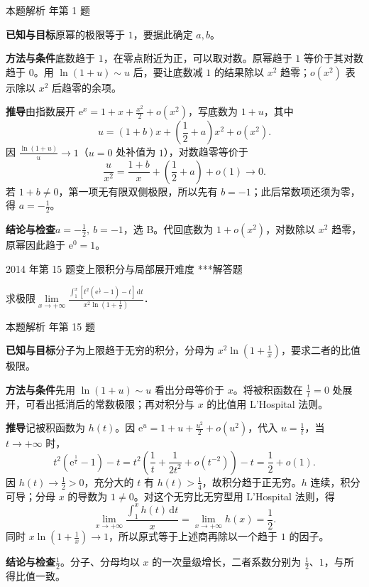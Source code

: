 \documentclass[UTF8,zihao=-4,fontset=fandol]{ctexart}
\renewcommand{\lim}{\operatorname*{lim}\limits}
\newcounter{BankQuestion}
\newcommand{\QuestionPage}[7]{%
  \stepcounter{BankQuestion}%
  \par\noindent\begin{minipage}{\linewidth}
  \raggedright
  {\small\textcolor{black!60}{#3\quad #5\quad 难度 #7}\hfill\textcolor{accent}{#2}}\par\smallskip}
\newcommand{\QuestionEnd}{\end{minipage}\par\medskip}
\newcommand{\QuestionPage}[7]{%
  \clearpage
  \stepcounter{BankQuestion}%
  {\small\textcolor{accent}{#1\hfill #2}}\par\medskip
  {\small\textcolor{black!60}{#3\quad #5\quad 难度 #7\hfill \arabic{BankQuestion} / 234}}\par\vspace{9bp}}
\newcommand{\QuestionEnd}{}
\newenvironment{QuestionSolution}[1]{%
  \clearpage
  {\small\textcolor{black!60}{本题解析\quad #1}}\par\medskip
}{\par\clearpage}
\begin{document}
\begin{QuestionSolution}{2018 年第 1 题}
\textbf{已知与目标}\quad 原幂的极限等于 \(1\)，要据此确定 \(a,b\)。

\textbf{方法与条件}\quad 底数趋于 \(1\)，在零点附近为正，可以取对数。原幂趋于 \(1\) 等价于其对数趋于 \(0\)。用 \(\ln(1+u)\sim u\) 后，要让底数减 \(1\) 的结果除以 \(x^2\) 趋零；\(o(x^2)\) 表示除以 \(x^2\) 后趋零的余项。

\textbf{推导}\quad 由指数展开 \(\mathrm e^x=1+x+\frac{x^2}{2}+o(x^2)\)，写底数为 \(1+u\)，其中
\[
u=(1+b)x+\left(\frac{1}{2}+a\right)x^2+o(x^2).
\]
因 \(\frac{\ln(1+u)}u\to1\)（\(u=0\) 处补值为 \(1\)），对数趋零等价于
\[\frac{u}{x^2}=\frac{1+b}{x}+\left(\frac12+a\right)+o(1)\to0.\]
若 \(1+b\ne0\)，第一项无有限双侧极限，所以先有 \(b=-1\)；此后常数项还须为零，得 \(a=-\frac12\)。

\textbf{结论与检查}\quad \(\boxed{a=-\frac{1}{2},\ b=-1}\)，选 B。代回底数为 \(1+o(x^2)\)，对数除以 \(x^2\) 趋零，原幂因此趋于 \(\mathrm e^0=1\)。
\end{QuestionSolution}

\QuestionPage{2.5 Taylor定理及其应用}{解答题}{2014 年第 15 题}{2}{变上限积分与局部展开}{102 / 234}{***}
求极限$\lim_{x \to +\infty}
\frac{\int_1^x \left[t^2\left(\mathrm{e}^{\frac{1}{t}} - 1\right) - t \right]\,\mathrm{d} t}
     {x^2\ln \left(1 + \frac{1}{x}\right)}$．
\QuestionEnd

\begin{QuestionSolution}{2014 年第 15 题}
\textbf{已知与目标}\quad 分子为上限趋于无穷的积分，分母为 \(x^2\ln(1+\frac1x)\)，要求二者的比值极限。

\textbf{方法与条件}\quad 先用 \(\ln(1+u)\sim u\) 看出分母等价于 \(x\)。将被积函数在 \(\frac1t=0\) 处展开，可看出抵消后的常数极限；再对积分与 \(x\) 的比值用 L'Hospital 法则。

\textbf{推导}\quad 记被积函数为 \(h(t)\)。因 \(\mathrm e^u=1+u+\frac{u^2}{2}+o(u^2)\)，代入 \(u=\frac1t\)，当 \(t\to+\infty\) 时，
\[
t^2(\mathrm{e}^{\frac{1}{t}}-1)-t
=t^2\left(\frac{1}{t}+\frac{1}{2t^2}+o(t^{-2})\right)-t
=\frac{1}{2}+o(1).
\]
因 \(h(t)\to\frac12>0\)，充分大的 \(t\) 有 \(h(t)>\frac14\)，故积分趋于正无穷。\(h\) 连续，积分可导；分母 \(x\) 的导数为 \(1\ne0\)。对这个无穷比无穷型用 L'Hospital 法则，得
\[\lim_{x\to+\infty}\frac{\int_1^x h(t)\,\mathrm dt}{x}=\lim_{x\to+\infty}h(x)=\frac12.\]
同时 \(x\ln(1+\frac1x)\to1\)，所以原式等于上述商再除以一个趋于 \(1\) 的因子。

\textbf{结论与检查}\quad \(\boxed{\frac{1}{2}}\)。分子、分母均以 \(x\) 的一次量级增长，二者系数分别为 \(\frac12\)、\(1\)，与所得比值一致。
\end{QuestionSolution}
\end{document}
